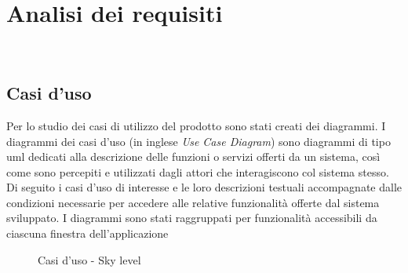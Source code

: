 \chapter{Analisi dei requisiti}
\label{cap:analisi-requisiti}

\\

\section{Casi d'uso}

Per lo studio dei casi di utilizzo del prodotto sono stati creati dei diagrammi.
I diagrammi dei casi d'uso (in inglese \emph{Use Case Diagram}) sono diagrammi di tipo \gls{uml} dedicati alla descrizione delle funzioni o servizi offerti da un sistema, così come sono percepiti e utilizzati dagli attori che interagiscono col sistema stesso.
Di seguito i casi d'uso di interesse e le loro descrizioni testuali accompagnate dalle condizioni necessarie per accedere alle relative funzionalità offerte dal sistema sviluppato. 
I diagrammi sono stati raggruppati per funzionalità accessibili da ciascuna finestra dell'applicazione 

\begin{figure}[!h] 
    \centering 
    \caption{Casi d'uso - Sky level}
\end{figure}



